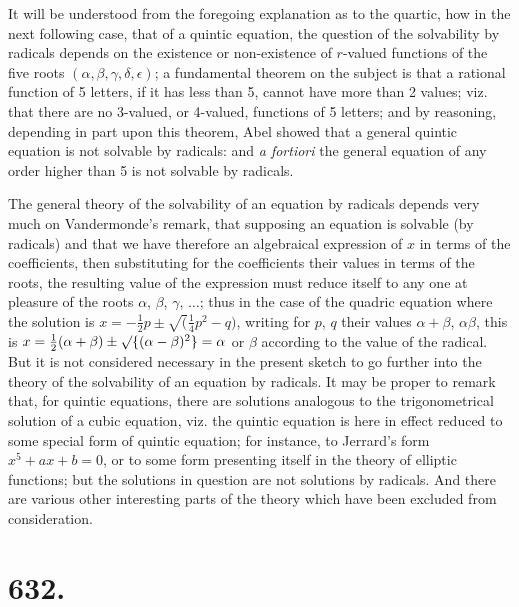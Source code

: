 \documentclass[12pt,a4paper]{article}
\theoremstyle{plain}
\theoremstyle{definition}
\theoremstyle{remark}
\begin{document}
It will be understood from the foregoing explanation as to the quartic, how in the next following case, that of a quintic equation, the question of the solvability by radicals depends on the existence or non-existence of $r$-valued functions of the five roots $(\alpha, \beta, \gamma, \delta, \epsilon)$; a fundamental theorem on the subject is that a rational function of 5 letters, if it has less than 5, cannot have more than 2 values; viz. that there are no 3-valued, or 4-valued, functions of 5 letters; and by reasoning, depending in part upon this theorem, Abel showed that a general quintic equation is not solvable by radicals: and \textit{a fortiori} the general equation of any order higher than 5 is not solvable by radicals.

The general theory of the solvability of an equation by radicals depends very much on Vandermonde's remark, that supposing an equation is solvable (by radicals) and that we have therefore an algebraical expression of $x$ in terms of the coefficients, then substituting for the coefficients their values in terms of the roots, the resulting value of the expression must reduce itself to any one at pleasure of the roots $\alpha$, $\beta$, $\gamma$, $\ldots$; thus in the case of the quadric equation where the solution is $x = -\frac{1}{2}p \pm \surd(\frac{1}{4}p^2 - q)$, writing for $p$, $q$ their values $\alpha + \beta$, $\alpha\beta$, this is $x = \frac{1}{2}(\alpha + \beta) \pm \surd\{(\alpha - \beta)^2\} = \alpha$ or $\beta$ according to the value of the radical. But it is not considered necessary in the present sketch to go further into the theory of the solvability of an equation by radicals. It may be proper to remark that, for quintic equations, there are solutions analogous to the trigonometrical solution of a cubic equation, viz. the quintic equation is here in effect reduced to some special form of quintic equation; for instance, to Jerrard's form $x^5 + ax + b = 0$, or to some form presenting itself in the theory of elliptic functions; but the solutions in question are not solutions by radicals. And there are various other interesting parts of the theory which have been excluded from consideration.

\clearpage
\setcounter{page}{12}

\section*{632.}
\end{document}
